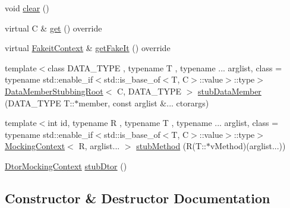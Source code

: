 \begin{DoxyCompactItemize}
void \mbox{\hyperlink{classfakeit_1_1MockImpl_a3985505d2ec7bd50a5d71f155c5ae458}{clear}} ()
\item 
virtual C \& \mbox{\hyperlink{classfakeit_1_1MockImpl_a8f287e857fde9a0941c618ff5459bd88}{get}} () override
\item 
virtual \mbox{\hyperlink{structfakeit_1_1FakeitContext}{Fakeit\+Context}} \& \mbox{\hyperlink{classfakeit_1_1MockImpl_a1b51dd1918a32ec5d450fc804ad37e63}{get\+Fake\+It}} () override
\item 
{\footnotesize template$<$class D\+A\+T\+A\+\_\+\+T\+Y\+PE , typename T , typename ... arglist, class  = typename std\+::enable\+\_\+if$<$std\+::is\+\_\+base\+\_\+of$<$\+T, C$>$\+::value$>$\+::type$>$ }\\\mbox{\hyperlink{classfakeit_1_1DataMemberStubbingRoot}{Data\+Member\+Stubbing\+Root}}$<$ C, D\+A\+T\+A\+\_\+\+T\+Y\+PE $>$ \mbox{\hyperlink{classfakeit_1_1MockImpl_acaa4bcb3984d3ca5fd1ecb3095393951}{stub\+Data\+Member}} (D\+A\+T\+A\+\_\+\+T\+Y\+PE T\+::$\ast$member, const arglist \&... ctorargs)
\item 
{\footnotesize template$<$int id, typename R , typename T , typename ... arglist, class  = typename std\+::enable\+\_\+if$<$std\+::is\+\_\+base\+\_\+of$<$\+T, C$>$\+::value$>$\+::type$>$ }\\\mbox{\hyperlink{classfakeit_1_1MockingContext}{Mocking\+Context}}$<$ R, arglist... $>$ \mbox{\hyperlink{classfakeit_1_1MockImpl_a603befd40e35ea88c7efee965f15bb60}{stub\+Method}} (R(T\+::$\ast$v\+Method)(arglist...))
\item 
\mbox{\hyperlink{classfakeit_1_1DtorMockingContext}{Dtor\+Mocking\+Context}} \mbox{\hyperlink{classfakeit_1_1MockImpl_ae64cb908c91a96faefbf0fabac948f29}{stub\+Dtor}} ()
\end{DoxyCompactItemize}


\subsection{Constructor \& Destructor Documentation}
\mbox{\label{classfakeit_1_1MockImpl_aeabb99e36f2ef5fea7856db165fe01d3}} 
